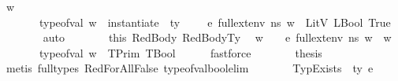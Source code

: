 \begin{isabellebody}
\ w\ \isanewline
\ \ \ \ \ \ \ {\isachardoublequoteopen}type{\isacharunderscore}{\kern0pt}of{\isacharunderscore}{\kern0pt}val\ w\ {\isacharequal}{\kern0pt}\ instantiate\ {\isasymOmega}\ ty{\isachardoublequoteclose}\ \ {\isachardoublequoteopen}{\isasymnot}\ {\isacharparenleft}{\kern0pt}{\isasymLambda}{\isacharcomma}{\kern0pt}{\isasymGamma}{\isacharcomma}{\kern0pt}{\isasymOmega}\ {\isasymturnstile}\ {\isasymlangle}e{\isacharcomma}{\kern0pt}\ full{\isacharunderscore}{\kern0pt}ext{\isacharunderscore}{\kern0pt}env\ n{\isacharunderscore}{\kern0pt}s\ w{\isasymrangle}\ {\isasymDown}\ LitV\ {\isacharparenleft}{\kern0pt}LBool\ True{\isacharparenright}{\kern0pt}{\isacharparenright}{\kern0pt}{\isachardoublequoteclose}\isanewline
\ \ \ \ \ \ \isamarkupfalse%
\ auto\isanewline
\ \ \ \ \isamarkupfalse%
\ \isamarkupfalse%
\ this\ RedBody\ RedBodyTy\ \isamarkupfalse%
\ w{\isacharprime}{\kern0pt}\ \ {\isachardoublequoteopen}{\isasymLambda}{\isacharcomma}{\kern0pt}{\isasymGamma}{\isacharcomma}{\kern0pt}{\isasymOmega}\ {\isasymturnstile}\ {\isasymlangle}e{\isacharcomma}{\kern0pt}\ full{\isacharunderscore}{\kern0pt}ext{\isacharunderscore}{\kern0pt}env\ n{\isacharunderscore}{\kern0pt}s\ w{\isasymrangle}\ {\isasymDown}\ w{\isacharprime}{\kern0pt}{\isachardoublequoteclose}\isanewline
\ \ \ \ \ \ \ {\isachardoublequoteopen}type{\isacharunderscore}{\kern0pt}of{\isacharunderscore}{\kern0pt}val\ w{\isacharprime}{\kern0pt}\ {\isacharequal}{\kern0pt}\ TPrim\ {\isacharparenleft}{\kern0pt}TBool{\isacharparenright}{\kern0pt}{\isachardoublequoteclose}\isanewline
\ \ \ \ \isamarkupfalse%
\ fastforce\isanewline
\ \ \ \ \isamarkupfalse%
\ \isamarkupfalse%
\ {\isacharquery}{\kern0pt}thesis\isanewline
\ \ \ \ \ \ \isamarkupfalse%
\ {\isacharparenleft}{\kern0pt}metis\ {\isacharparenleft}{\kern0pt}full{\isacharunderscore}{\kern0pt}types{\isacharparenright}{\kern0pt}\ RedForAllFalse\ type{\isacharunderscore}{\kern0pt}of{\isacharunderscore}{\kern0pt}val{\isacharunderscore}{\kern0pt}bool{\isacharunderscore}{\kern0pt}elim{\isacharparenright}{\kern0pt}\ \isanewline
\ \ \isamarkupfalse%
\isanewline
{}\isamarkupfalse%
\isanewline
\ \ \isamarkupfalse%
\ {\isacharparenleft}{\kern0pt}TypExists\ {\isasymDelta}\ ty\ e{\isacharparenright}{\kern0pt}\isanewline
\ \ \isanewline
\ \ \isamarkupfalse%

\end{isabellebody}
